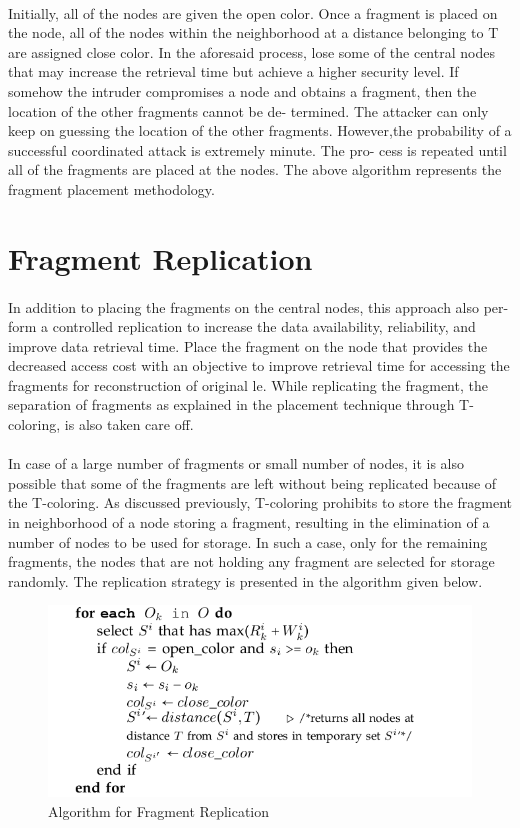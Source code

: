 \paragraph*{}

Initially, all of the nodes are given the open color. Once a fragment is placed on the
node, all of the nodes within the neighborhood at a distance belonging to T are assigned
close color. In the aforesaid process, lose some of the central nodes that may increase the
retrieval time but achieve a higher security level. If somehow the intruder compromises
a node and obtains a fragment, then the location of the other fragments cannot be de-
termined. The attacker can only keep on guessing the location of the other fragments.
However,the probability of a successful coordinated attack is extremely minute. The pro-
cess is repeated until all of the fragments are placed at the nodes. The above algorithm
represents the fragment placement methodology.
\section{Fragment Replication}
\paragraph*{}
In addition to placing the fragments on the central nodes, this approach also per-
form a controlled replication to increase the data availability, reliability, and improve data
retrieval time. Place the fragment on the node that provides the decreased access cost
with an objective to improve retrieval time for accessing the fragments for reconstruction
of original le. While replicating the fragment, the separation of fragments as explained in
the placement technique through T- coloring, is also taken care off.
\paragraph*{}
In case of a large number of fragments or small number of nodes, it is also possible
that some of the fragments are left without being replicated because of the T-coloring.
As discussed previously, T-coloring prohibits to store the fragment in neighborhood of a
node storing a fragment, resulting in the elimination of a number of nodes to be used for
storage. In such a case, only for the remaining fragments, the nodes that are not holding
any fragment are selected for storage randomly. The replication strategy is presented in
the algorithm given below.
\begin{figure}
	\centering
	\includegraphics[scale=0.5]{replicationalgo}
	\caption{Algorithm for Fragment Replication}
\end{figure}
